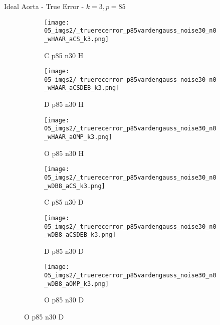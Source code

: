 \begin{frame}{Ideal Aorta - True Error - $k=3,p=85$}{}
\begin{figure}
\begin{subfigure}{0.13\textwidth}
\texttt{[image: 05\_imgs2/\_truerecerror\_p85vardengauss\_noise30\_n0\_wHAAR\_aCS\_k3.png]}
\caption*{\tiny C p85 n30 H}
\end{subfigure}
\begin{subfigure}{0.13\textwidth}
\texttt{[image: 05\_imgs2/\_truerecerror\_p85vardengauss\_noise30\_n0\_wHAAR\_aCSDEB\_k3.png]}
\caption*{\tiny D p85 n30 H}
\end{subfigure}
\begin{subfigure}{0.13\textwidth}
\texttt{[image: 05\_imgs2/\_truerecerror\_p85vardengauss\_noise30\_n0\_wHAAR\_aOMP\_k3.png]}
\caption*{\tiny O p85 n30 H}
\end{subfigure}
\begin{subfigure}{0.13\textwidth}
\texttt{[image: 05\_imgs2/\_truerecerror\_p85vardengauss\_noise30\_n0\_wDB8\_aCS\_k3.png]}
\caption*{\tiny C p85 n30 D}
\end{subfigure}
\begin{subfigure}{0.13\textwidth}
\texttt{[image: 05\_imgs2/\_truerecerror\_p85vardengauss\_noise30\_n0\_wDB8\_aCSDEB\_k3.png]}
\caption*{\tiny D p85 n30 D}
\end{subfigure}
\begin{subfigure}{0.13\textwidth}
\texttt{[image: 05\_imgs2/\_truerecerror\_p85vardengauss\_noise30\_n0\_wDB8\_aOMP\_k3.png]}
\caption*{\tiny O p85 n30 D}
\end{subfigure}
\end{figure}
\end{frame}

